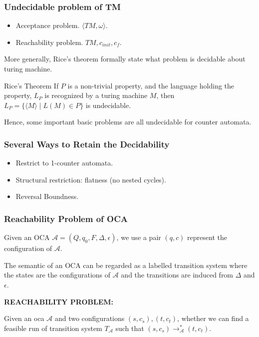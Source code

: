 \documentclass[11pt]{beamer}
\begin{document}
\begin{frame}\frametitle{Undecidable problem of TM}
\begin{itemize}
\item Acceptance problem. $\langle TM, \omega\rangle$.
\item Reachability problem. $TM, c_{init}, c_{f}$.

\end{itemize}
More generally, Rice's theorem formally state what problem is decidable about turing machine.

\begin{theorem}{Rice's Theorem}
If $P$ is a non-trivial property, and the language holding the property, $L_P$ is recognized by a turing machine $M$, then $L_P = \{\langle M\rangle\mid L(M) \in P\}$ is undecidable.
\end{theorem}


Hence, some important basic problems are all undecidable for counter automata.
\end{frame}


\begin{frame}\frametitle{Several Ways to Retain the Decidability}
\begin{itemize}
\item Restrict to 1-counter automata.

\item Structural restriction: flatness (no nested cycles).

\item Reversal Boundness.
\end{itemize}
\end{frame}


\begin{frame}\frametitle{Reachability Problem of OCA}

\begin{definition}
Given an OCA $\mathcal{A} = (Q, q_0, F, \Delta, \epsilon)$, we use a pair $(q, c)$ represent the configuration of $\mathcal{A}$.

\end{definition}

The semantic of an OCA can be regarded as a labelled transition system where the states are the configurations of $\mathcal{A}$ and the transitions are induced from $\Delta$ and $\epsilon$.


\textbf{REACHABILITY PROBLEM:}

Given an oca $\mathcal{A}$ and two configurations $(s, c_s), (t, c_t)$, whether we can find a feasible run of transition system $T_{\mathcal{A}}$ such that $(s,c_s)\rightarrow_{\mathcal{A}}^*(t,c_t)$.


\end{frame}
\end{document}
